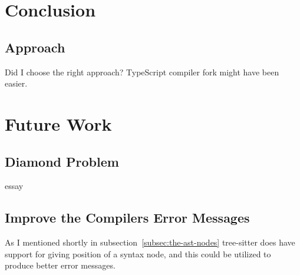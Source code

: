 \section{Conclusion}\label{sec:result-conclusion}

\subsection{Approach}\label{subsec:result-approach}

Did I choose the right approach?
TypeScript compiler fork might have been easier.


\section{Future Work}\label{sec:future-work}

\subsection{Diamond Problem}\label{subsec:diamond-problem}

essay

\subsection{Improve the Compilers Error Messages}\label{subsec:compiler-with-focus-on-error-messages}

As I mentioned shortly in subsection~\vref{subsec:the-ast-nodes} tree-sitter does have support for giving position of a syntax node, and this could be utilized to produce better error messages.
